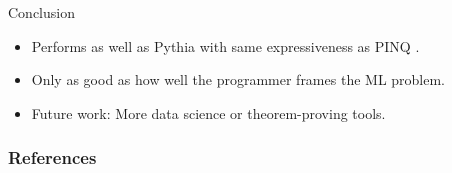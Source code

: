 \documentclass{beamer}
\begin{document}
\begin{frame}{Conclusion}
\begin{itemize}
\item Performs as well as Pythia \cite{Kotsogiannis:2017} with same expressiveness as PINQ \cite{McSherry:2010}.
\item Only as good as how well the programmer frames the ML problem.
\item Future work: More data science or theorem-proving tools.
\end{itemize}
\end{frame}

\begin{frame}
\frametitle{References}


\end{frame}
\end{document}
